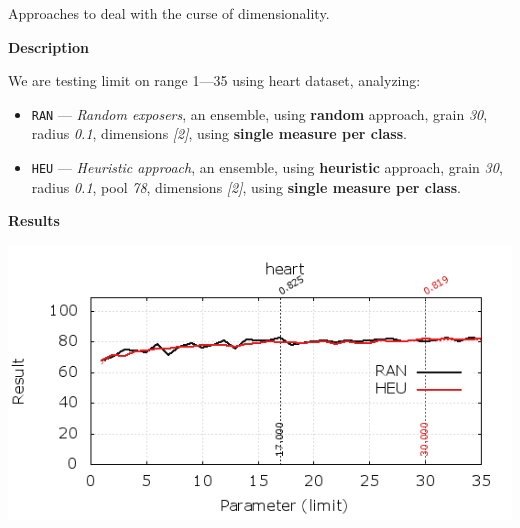 \begin{experiment}{Approaches to deal with the curse of dimensionality.}{\small \sffamily\textbf{Description}

We are testing limit on range 1---35 using heart dataset, analyzing:

\begin{itemize}
\tightlist
	\item \texttt{RAN} --- \emph{Random \emph{exposers}}, an ensemble, using \textbf{random} approach, grain \emph{30}, radius \emph{0.1}, dimensions \emph{[2]}, using \textbf{single measure per class}.
	\item \texttt{HEU} --- \emph{Heuristic approach}, an ensemble, using \textbf{heuristic} approach, grain \emph{30}, radius \emph{0.1}, pool \emph{78}, dimensions \emph{[2]}, using \textbf{single measure per class}.

\end{itemize}


\textbf{Results}

\centering
	\includegraphics[width=.75\textwidth]{plots/experiment_8_heart.png}
	\label{fig:experiment_8}
}\end{experiment}
